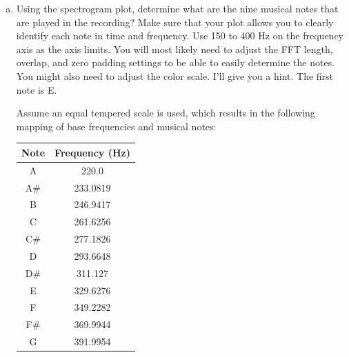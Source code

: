 \begin{enumerate}
\begin{enumerate}[a)]
\item Using the spectrogram plot, determine what are the nine musical
  notes that are played in the recording? Make sure that your plot
  allows you to clearly identify each note in time and frequency. Use
  150 to 400 Hz on the frequency axis as the axis limits. You will
  most likely need to adjust the FFT length, overlap, and zero padding
  settings to be able to easily determine the notes. You might also
  need to adjust the color scale. I'll give you a hint. The first note
  is E.

Assume an equal tempered scale is used, which results in the following mapping of base frequencies and musical notes: 
\begin{center}
\begin{tabular}{c|c}
Note & Frequency (Hz) \\
\hline 
A & 220.0\\
A\# & 233.0819 \\
B & 246.9417 \\
C & 261.6256 \\
C\# & 277.1826 \\
D & 293.6648 \\
D\# & 311.127 \\
E & 329.6276 \\
F & 349.2282 \\
F\# & 369.9944 \\
G & 391.9954 
\end{tabular}
\end{center}




\end{enumerate}
\end{enumerate}